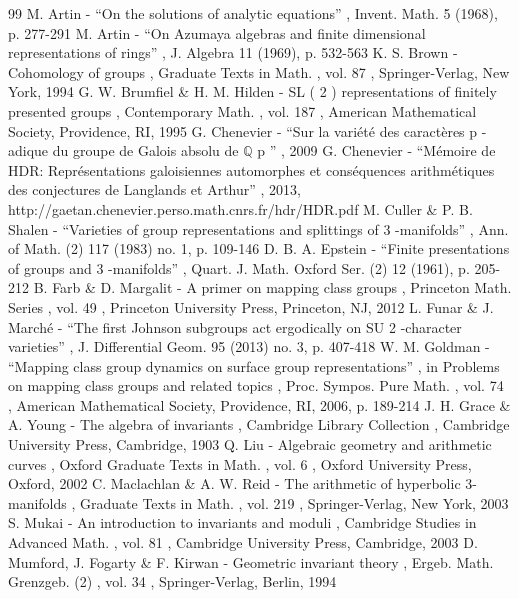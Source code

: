 \documentclass[11pt]{article}
\theoremstyle{definition}
\begin{document}
\begin{thebibliography}{99}
 M. Artin - “On the solutions of analytic equations” , Invent. Math. 5 (1968), p. 277-291
 M. Artin - “On Azumaya algebras and finite dimensional representations of rings” , J. Algebra 11 (1969), p. 532-563
 K. S. Brown - Cohomology of groups , Graduate Texts in Math. , vol. 87 , Springer-Verlag, New York, 1994
 G. W. Brumfiel \& H. M. Hilden - SL ( 2 ) representations of finitely presented groups , Contemporary Math. , vol. 187 , American Mathematical Society, Providence, RI, 1995
 G. Chenevier - “Sur la variété des caractères p -adique du groupe de Galois absolu de \(\mathbb Q\) p ” , 2009
 G. Chenevier - “Mémoire de HDR: Représentations galoisiennes automorphes et conséquences arithmétiques des conjectures de Langlands et Arthur” , 2013, http://gaetan.chenevier.perso.math.cnrs.fr/hdr/HDR.pdf
 M. Culler \& P. B. Shalen - “Varieties of group representations and splittings of 3 -manifolds” , Ann. of Math. (2) 117 (1983) no. 1, p. 109-146
 D. B. A. Epstein - “Finite presentations of groups and 3 -manifolds” , Quart. J. Math. Oxford Ser. (2) 12 (1961), p. 205-212
 B. Farb \& D. Margalit - A primer on mapping class groups , Princeton Math. Series , vol. 49 , Princeton University Press, Princeton, NJ, 2012
 L. Funar \& J. Marché - “The first Johnson subgroups act ergodically on SU 2 -character varieties” , J. Differential Geom. 95 (2013) no. 3, p. 407-418
 W. M. Goldman - “Mapping class group dynamics on surface group representations” , in Problems on mapping class groups and related topics , Proc. Sympos. Pure Math. , vol. 74 , American Mathematical Society, Providence, RI, 2006, p. 189-214
 J. H. Grace \& A. Young - The algebra of invariants , Cambridge Library Collection , Cambridge University Press, Cambridge, 1903
 Q. Liu - Algebraic geometry and arithmetic curves , Oxford Graduate Texts in Math. , vol. 6 , Oxford University Press, Oxford, 2002
 C. Maclachlan \& A. W. Reid - The arithmetic of hyperbolic 3-manifolds , Graduate Texts in Math. , vol. 219 , Springer-Verlag, New York, 2003
 S. Mukai - An introduction to invariants and moduli , Cambridge Studies in Advanced Math. , vol. 81 , Cambridge University Press, Cambridge, 2003
 D. Mumford, J. Fogarty \& F. Kirwan - Geometric invariant theory , Ergeb. Math. Grenzgeb. (2) , vol. 34 , Springer-Verlag, Berlin, 1994

\end{thebibliography}
\end{document}
